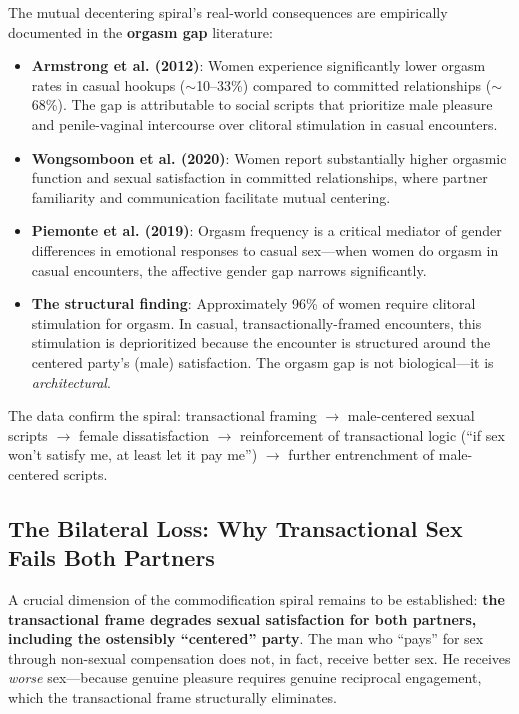 \documentclass[12pt,openany]{book}
\numberwithin{equation}{chapter}
\begin{document}
The mutual decentering spiral's real-world consequences are empirically documented in the \textbf{orgasm gap} literature:

\begin{itemize}
    \item \textbf{Armstrong et al. (2012)}: Women experience significantly lower orgasm rates in casual hookups ($\sim$10--33\%) compared to committed relationships ($\sim$68\%). The gap is attributable to social scripts that prioritize male pleasure and penile-vaginal intercourse over clitoral stimulation in casual encounters.
    
    \item \textbf{Wongsomboon et al. (2020)}: Women report substantially higher orgasmic function and sexual satisfaction in committed relationships, where partner familiarity and communication facilitate mutual centering.
    
    \item \textbf{Piemonte et al. (2019)}: Orgasm frequency is a critical mediator of gender differences in emotional responses to casual sex---when women do orgasm in casual encounters, the affective gender gap narrows significantly.
    
    \item \textbf{The structural finding}: Approximately 96\% of women require clitoral stimulation for orgasm. In casual, transactionally-framed encounters, this stimulation is deprioritized because the encounter is structured around the centered party's (male) satisfaction. The orgasm gap is not biological---it is \textit{architectural}.
\end{itemize}

The data confirm the spiral: transactional framing $\rightarrow$ male-centered sexual scripts $\rightarrow$ female dissatisfaction $\rightarrow$ reinforcement of transactional logic (``if sex won't satisfy me, at least let it pay me'') $\rightarrow$ further entrenchment of male-centered scripts.

\subsection{The Bilateral Loss: Why Transactional Sex Fails Both Partners}

A crucial dimension of the commodification spiral remains to be established: \textbf{the transactional frame degrades sexual satisfaction for both partners, including the ostensibly ``centered'' party}. The man who ``pays'' for sex through non-sexual compensation does not, in fact, receive better sex. He receives \textit{worse} sex---because genuine pleasure requires genuine reciprocal engagement, which the transactional frame structurally eliminates.
\end{document}
